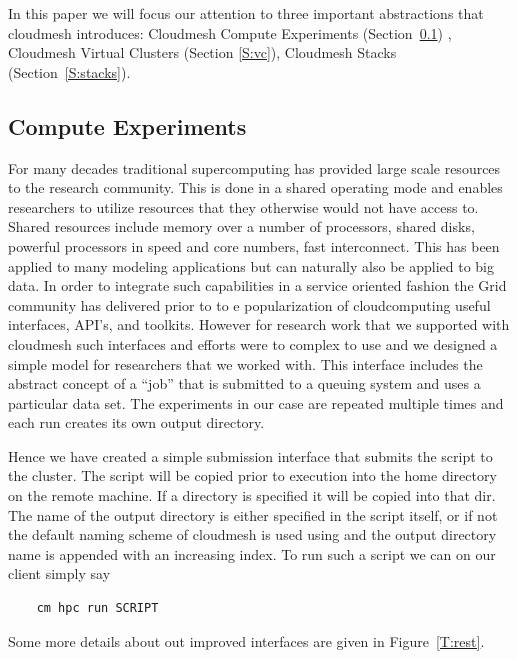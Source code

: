 In this paper we will focus our attention to three important
abstractions that cloudmesh introduces: Cloudmesh Compute Experiments
(Section~\ref{S:experiments}) , Cloudmesh Virtual Clusters (Section
\ref{S:vc}), Cloudmesh Stacks (Section~\ref{S:stacks}).

\subsection{Compute Experiments} \label{S:experiments}

For many decades traditional supercomputing has provided large scale
resources to the research community. This is done in a shared
operating mode and enables researchers to utilize resources that they
otherwise would not have access to. Shared resources include
memory over a number of processors, shared disks, powerful processors
in speed and core numbers, fast interconnect. This has been applied to
many modeling applications but can naturally also be applied to big
data. In order to integrate such capabilities in a service oriented
fashion the Grid community has delivered prior to to e popularization
of cloudcomputing useful interfaces, API's, and toolkits. However for
research work that we supported with cloudmesh such interfaces and
efforts were to complex to use and we designed a simple model for
researchers that we worked with. This interface includes the abstract
concept of a ``job'' that is submitted to a queuing system and uses a
particular data set. The experiments in our case are repeated multiple
times and each run creates its own output directory.

Hence we have created a simple submission interface that submits the
script to the cluster. The script will be copied prior to execution
into the home directory on the remote machine. If a directory is
specified it will be copied into that dir.  The name of the output
directory is either specified in the script itself, or if not the
default naming scheme of cloudmesh is used using and the output
directory name is appended with an increasing index. To run such a
script we can on our client simply say
 
\begin{Verbatim}
    cm hpc run SCRIPT
\end{Verbatim}

Some more details about out improved interfaces are given in
Figure~\ref{T:rest}.

